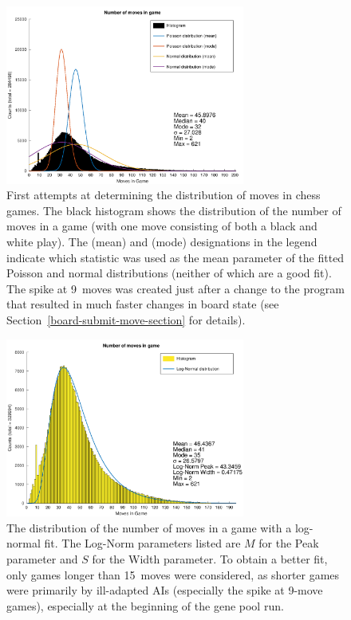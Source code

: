 \documentclass[letterpaper]{article}
\renewcommand{\_}{\allowbreak\textunderscore\allowbreak}
\begin{document}
\begin{figure}[tbh]
	\centering
	\includegraphics[width=0.7\textwidth]{game_length_distribution.png}
	\caption{First attempts at determining the distribution of moves in chess games. The black histogram shows the distribution of the number of moves in a game (with one move consisting of both a black and white play). The (mean) and (mode) designations in the legend indicate which statistic was used as the mean parameter of the fitted Poisson and normal distributions (neither of which are a good fit). The spike at 9~moves was created just after a change to the program that resulted in much faster changes in board state (see Section~\ref{board-submit-move-section} for details).}\label{game-length-plot}
\end{figure}

\begin{figure}[tbh]
	\centering
	\includegraphics[width=0.7\textwidth]{game_length_log_norm_distribution.png}
	\caption{The distribution of the number of moves in a game with a log-normal fit. The Log-Norm parameters listed are \(M\) for the Peak parameter and \(S\) for the Width parameter. To obtain a better fit, only games longer than 15~moves were considered, as shorter games were primarily by ill-adapted AIs (especially the spike at 9-move games), especially at the beginning of the gene pool run.}\label{log-norm-plot}
\end{figure}
\end{document}
